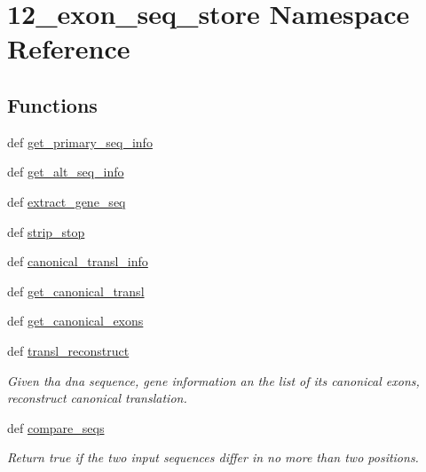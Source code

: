 \hypertarget{namespace12__exon__seq__store}{\section{12\-\_\-exon\-\_\-seq\-\_\-store Namespace Reference}
\label{namespace12__exon__seq__store}
}
\subsection*{Functions}
\begin{DoxyCompactItemize}
\item 
def \hyperlink{namespace12__exon__seq__store_aa683a56ce5b02b6140dcff8940a5fd7e}{get\-\_\-primary\-\_\-seq\-\_\-info}
\item 
def \hyperlink{namespace12__exon__seq__store_a7e07147d33945c4af6b7ad2abaf3cd85}{get\-\_\-alt\-\_\-seq\-\_\-info}
\item 
def \hyperlink{namespace12__exon__seq__store_a6e2645c20b8ecb2f7644276caa025214}{extract\-\_\-gene\-\_\-seq}
\item 
def \hyperlink{namespace12__exon__seq__store_aba2efa8f46ef665d66b5f51a0deac1a0}{strip\-\_\-stop}
\item 
def \hyperlink{namespace12__exon__seq__store_a0b65b4fd52a3291d2086528cc1f47858}{canonical\-\_\-transl\-\_\-info}
\item 
def \hyperlink{namespace12__exon__seq__store_acf44dc16c6b297ff8db54e486dfd0fba}{get\-\_\-canonical\-\_\-transl}
\item 
def \hyperlink{namespace12__exon__seq__store_a9573a058a9f0bde8a68724ce31cc3093}{get\-\_\-canonical\-\_\-exons}
\item 
def \hyperlink{namespace12__exon__seq__store_a163f10dd9974fa59e5dcb0702b722de6}{transl\-\_\-reconstruct}
\begin{DoxyCompactList}\small\item\em Given tha dna sequence, gene information an the list of its canonical exons, reconstruct canonical translation. \end{DoxyCompactList}\item 
def \hyperlink{namespace12__exon__seq__store_acf9f17f2aa3d0f54e3662c145a606a32}{compare\-\_\-seqs}
\begin{DoxyCompactList}\small\item\em Return true if the two input sequences differ in no more than two positions. \end{DoxyCompactList}\item 

\end{DoxyCompactItemize}
